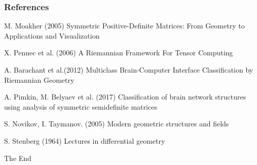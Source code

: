 \documentclass{beamer}
\begin{document}
\begin{frame}
\frametitle{References}
\footnotesize
\begin{thebibliography}{99} %
 M. Moakher (2005)
\newblock Symmetric Positive-Deﬁnite Matrices: From Geometry to Applications and Visualization
	
X. Pennec et al. (2006)
\newblock A Riemannian Framework For Tensor Computing 
	

 A. Barachant et al.(2012)
\newblock Multiclass Brain-Computer Interface Classiﬁcation by Riemannian Geometry

  A. Pimkin, M. Belyaev et al. (2017)
\newblock Classification of brain network structures using analysis of symmetric semidefinite matrices

  S. Novikov, I. Taymanov. (2005)
\newblock Modern geometric structures and fields

  S. Stenberg (1964)
\newblock Lectures in differential geometry
\end{thebibliography}
\end{frame}


\begin{frame}
\Huge{\centerline{The End}}
\end{frame}

\end{document}
